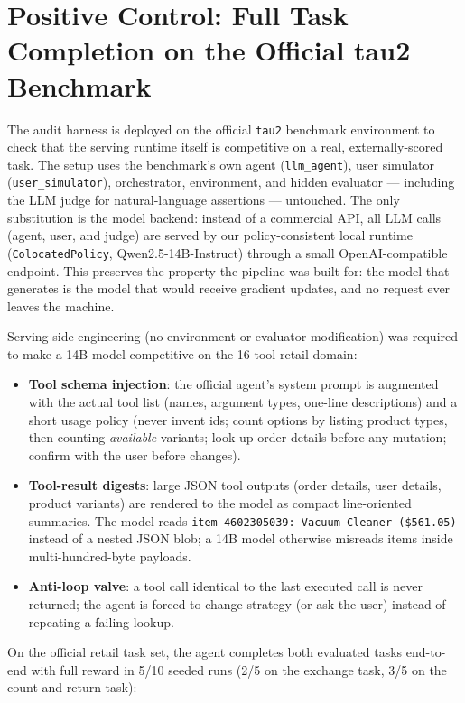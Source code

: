 \section{Positive Control: Full Task Completion on the Official tau2 Benchmark}

The audit harness is deployed on the official \texttt{tau2} benchmark
environment to check that the serving runtime itself is competitive on a
real, externally-scored task. The setup uses the benchmark's own agent
(\texttt{llm\_agent}), user simulator (\texttt{user\_simulator}),
orchestrator, environment, and hidden evaluator --- including the LLM judge
for natural-language assertions --- untouched. The only substitution is the
model backend: instead of a commercial API, all LLM calls (agent, user, and
judge) are served by our policy-consistent local runtime
(\texttt{ColocatedPolicy}, Qwen2.5-14B-Instruct) through a small
OpenAI-compatible endpoint. This preserves the property the pipeline was
built for: the model that generates is the model that would receive
gradient updates, and no request ever leaves the machine.

Serving-side engineering (no environment or evaluator modification) was
required to make a 14B model competitive on the 16-tool retail domain:

\begin{itemize}
\item \textbf{Tool schema injection}: the official agent's system prompt is
  augmented with the actual tool list (names, argument types, one-line
  descriptions) and a short usage policy (never invent ids; count options
  by listing product types, then counting \emph{available} variants; look
  up order details before any mutation; confirm with the user before
  changes).
\item \textbf{Tool-result digests}: large JSON tool outputs (order details,
  user details, product variants) are rendered to the model as compact
  line-oriented summaries. The model reads \texttt{item 4602305039: Vacuum
  Cleaner (\$561.05)} instead of a nested JSON blob; a 14B model otherwise
  misreads items inside multi-hundred-byte payloads.
\item \textbf{Anti-loop valve}: a tool call identical to the last executed
  call is never returned; the agent is forced to change strategy (or ask
  the user) instead of repeating a failing lookup.
\end{itemize}

On the official retail task set, the agent completes both evaluated tasks
end-to-end with full reward in 5/10 seeded runs (2/5 on the exchange
task, 3/5 on the count-and-return task):


